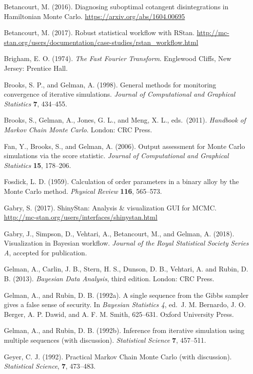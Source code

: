 \documentclass[11pt]{article}
\begin{document}
\noindent

\bibitem Betancourt, M. (2016).  Diagnosing suboptimal cotangent disintegrations in Hamiltonian Monte Carlo. \url{https://arxiv.org/abs/1604.00695}

\bibitem Betancourt, M. (2017).  Robust statistical workflow with RStan.  \url{http://mc-stan.org/users/documentation/case-studies/rstan_workflow.html}

\bibitem Brigham, E. O. (1974). {\em The Fast Fourier Transform}.  Englewood Cliffs, New Jersey: Prentice Hall.

\bibitem Brooks, S. P., and Gelman, A. (1998).  General methods for monitoring convergence of iterative simulations.  {\em Journal of Computational and Graphical Statistics} {\bf 7}, 434--455.

\bibitem Brooks, S., Gelman, A., Jones, G. L., and Meng, X. L., eds.\ (2011).  {\em Handbook of Markov Chain Monte Carlo}.  London:  CRC Press.

\bibitem Fan, Y., Brooks, S., and Gelman, A. (2006).  Output assessment for Monte Carlo simulations via the score statistic. {\em Journal of Computational and Graphical Statistics} {\bf 15}, 178--206.

\bibitem Fosdick, L. D. (1959).  Calculation of order parameters in a binary alloy by the Monte Carlo method. {\em Physical Review} {\bf 116}, 565--573.

\bibitem Gabry, S. (2017).  ShinyStan:  Analysis \& visualization GUI for MCMC.  \url{http://mc-stan.org/users/interfaces/shinystan.html}

\bibitem Gabry, J., Simpson, D., Vehtari, A., Betancourt, M., and Gelman, A. (2018). Visualization in Bayesian workflow. {\em Journal of the Royal Statistical Society Series A}, accepted for publication.
  
\bibitem Gelman, A., Carlin, J. B., Stern, H. S., Dunson, D. B., Vehtari, A. and Rubin, D. B. (2013). {\em Bayesian Data Analysis}, third edition. London:  CRC Press.

\bibitem Gelman, A., and Rubin, D. B. (1992a).  A single sequence from the Gibbs sampler gives a false sense of security.
In {\em Bayesian Statistics 4}, ed.\ J. M. Bernardo, J. O. Berger, A. P. Dawid, and A. F. M. Smith, 625--631.  Oxford University Press.

\bibitem Gelman, A., and Rubin, D. B. (1992b).   Inference from iterative simulation using multiple sequences (with discussion).  {\em Statistical Science} {\bf 7}, 457--511.

\bibitem Geyer, C. J. (1992). Practical {Markov} Chain {Monte} {Carlo} (with discussion). {\em Statistical Science}, {\bf 7}, 473--483.
\end{document}
